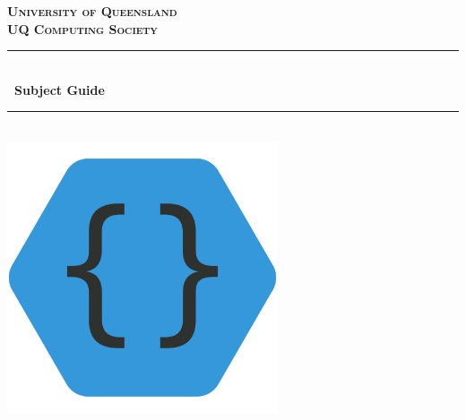 \begin{titlepage}
	\vspace*{\fill}
	\newcommand{\HRule}{\rule{\linewidth}{0.75mm}}
	\center
	\textsc{\Large \bfseries University of Queensland}\\[17.5mm]
	\textsc{\LARGE \bfseries UQ Computing Society}\\[10mm]
	\HRule \\[7.5mm]
	{\huge \bfseries \the\year\ Subject Guide}\\[4mm]
	\HRule \\[15mm]
	\includegraphics[width=8cm]{../assets/logo}\\[10mm]
	\vspace*{\fill}
	\vfill
\end{titlepage}